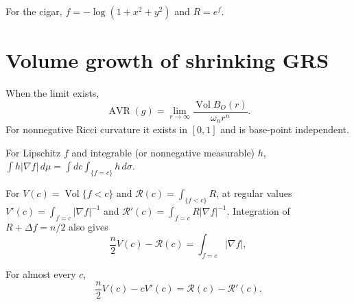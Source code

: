 \begin{remark}
\label{rem:chow-iv-cigar}

For the cigar, $f=-\log(1+x^2+y^2)$ and $R=e^f$.
\end{remark}

\section{Volume growth of shrinking GRS}

\begin{definition}
\label{def:chow-iv-avr}

When the limit exists,
\[
\operatorname{AVR}(g)=\lim_{r\to\infty}
\frac{\operatorname{Vol}B_O(r)}{\omega_nr^n}.
\]
For nonnegative Ricci curvature it exists in $[0,1]$ and is base-point
independent.
\end{definition}

\begin{proposition}
\label{prop:chow-iv-coarea}

For Lipschitz $f$ and integrable (or nonnegative measurable) $h$,
$\int h|\nabla f|\,d\mu=\int dc\int_{\{f=c\}}h\,d\sigma$.
\end{proposition}

\begin{lemma}
\label{lem:chow-iv-sublevel-derivatives}


For $V(c)=\operatorname{Vol}\{f<c\}$ and $\mathcal R(c)=\int_{\{f<c\}}R$,
at regular values $V'(c)=\int_{f=c}|\nabla f|^{-1}$ and
$\mathcal R'(c)=\int_{f=c}R|\nabla f|^{-1}$.  Integration of
$R+\Delta f=n/2$ also gives
\[
\frac n2V(c)-\mathcal R(c)=\int_{f=c}|\nabla f|,
\]
\end{lemma}

\begin{lemma}
\label{lem:chow-iv-sublevel-differential-identity}


For almost every $c$,
\[
\frac n2V(c)-cV'(c)=\mathcal R(c)-\mathcal R'(c).
\]
\end{lemma}

